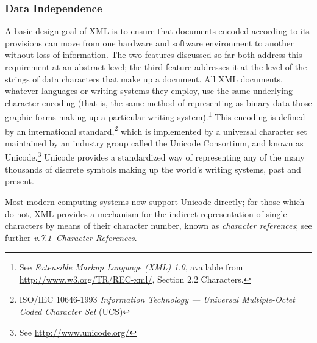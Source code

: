 \subsubsection[{Data Independence}]{Data Independence}\label{SG113}\par
A basic design goal of XML is to ensure that documents encoded according to its provisions can move from one hardware and software environment to another without loss of information. The two features discussed so far both address this requirement at an abstract level; the third feature addresses it at the level of the strings of data characters that make up a document. All XML documents, whatever languages or writing systems they employ, use the same underlying character encoding (that is, the same method of representing as binary data those graphic forms making up a particular writing system).\footnote{See \textit{Extensible Markup Language (XML) 1.0}, available from \url{http://www.w3.org/TR/REC-xml/}, Section 2.2 Characters.} This encoding is defined by an international standard,\footnote{ISO/IEC 10646-1993 \textit{Information Technology — Universal Multiple-Octet Coded Character Set} (UCS)} which is implemented by a universal character set maintained by an industry group called the Unicode Consortium, and known as Unicode.\footnote{See \url{http://www.unicode.org/}} Unicode provides a standardized way of representing any of the many thousands of discrete symbols making up the world's writing systems, past and present.\par
Most modern computing systems now support Unicode directly; for those which do not, XML provides a mechanism for the indirect representation of single characters by means of their character number, known as \textit{character references}; see further \textit{\hyperref[SG-er]{v.7.1\ Character References}}.
